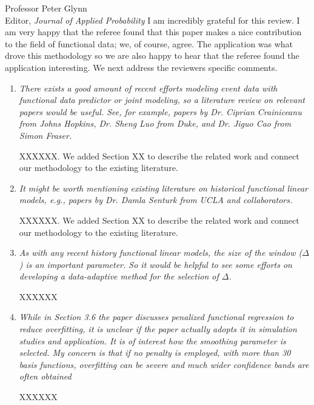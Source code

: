 \documentclass[11pt]{letter} %
\begin{document}
\begin{letter}{Professor
	Peter Glynn\\
	Editor, {\em Journal of Applied Probability}}
I am incredibly grateful for this review.  I am very happy that the referee found that this paper makes a nice contribution to the field of functional data; we, of course, agree. The application was what drove this methodology so we are also happy to hear that the referee found the application interesting. We next address the reviewers specific comments.

\begin{enumerate}
\item {\it There exists a good amount of recent efforts modeling event data with functional data predictor or joint modeling, so a literature review on relevant papers would be useful. See, for example, papers by Dr. Ciprian Crainiceanu from Johns Hopkins, Dr. Sheng Luo from Duke, and Dr. Jiguo Cao from Simon Fraser.}

\vspace{5mm}
XXXXXX.
We added Section XX to describe the related work and connect our methodology to the existing literature.
\vspace{5mm}

\item {\it It might be worth mentioning existing literature on historical functional linear models, e.g., papers by Dr. Damla Senturk from UCLA and collaborators.}

\vspace{5mm}
XXXXXX.
We added Section XX to describe the related work and connect our methodology to the existing literature.
\vspace{5mm}

\item {\it As with any recent history functional linear models, the size of the window ($\Delta$) is an important parameter. So it would be helpful to see some efforts on developing a data-adaptive method for the selection of $\Delta$.}

\vspace{5mm}
XXXXXX
\vspace{5mm}

\item {\it While in Section 3.6 the paper discusses penalized functional regression to reduce overfitting, it is unclear if the paper actually adopts it in simulation studies and application. It is of interest how the smoothing parameter is selected. My concern is that if no penalty is employed, with more than 30 basis functions, overfitting can be severe and much wider confidence bands are often obtained}

\vspace{5mm}
XXXXXX
\vspace{5mm}


\end{enumerate}
\end{letter}
\end{document}
